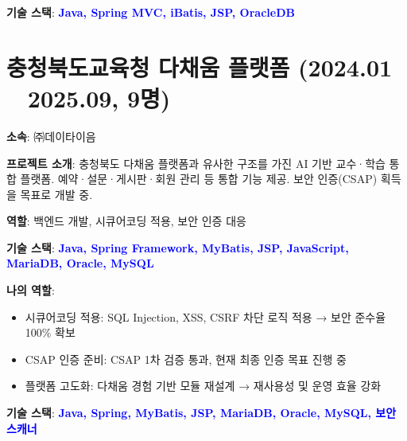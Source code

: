 \documentclass[a4paper,11pt]{article}
\newcommand{\tech}[1]{\textbf{\textcolor{blue}{#1}}}
\begin{document}
\textbf{기술 스택}: \tech{Java, Spring MVC, iBatis, JSP, OracleDB}

\section{충청북도교육청 다채움 플랫폼 (2024.01 ~ 2025.09, 9명)}

\textbf{소속}: ㈜데이타이음

\textbf{프로젝트 소개}:  
충청북도 다채움 플랫폼과 유사한 구조를 가진 AI 기반 교수·학습 통합 플랫폼.  
예약·설문·게시판·회원 관리 등 통합 기능 제공.  
보안 인증(CSAP) 획득을 목표로 개발 중.

\textbf{역할}: 백엔드 개발, 시큐어코딩 적용, 보안 인증 대응 

\textbf{기술 스택}: \tech{Java, Spring Framework, MyBatis, JSP, JavaScript, MariaDB, Oracle, MySQL}

\textbf{나의 역할}:
\begin{itemize}[leftmargin=*]
  \item 시큐어코딩 적용: SQL Injection, XSS, CSRF 차단 로직 적용 → 보안 준수율 100\% 확보
  \item CSAP 인증 준비: CSAP 1차 검증 통과, 현재 최종 인증 목표 진행 중
  \item 플랫폼 고도화: 다채움 경험 기반 모듈 재설계 → 재사용성 및 운영 효율 강화
\end{itemize}

\textbf{기술 스택}: \tech{Java, Spring, MyBatis, JSP, MariaDB, Oracle, MySQL, 보안 스캐너}
\end{document}
